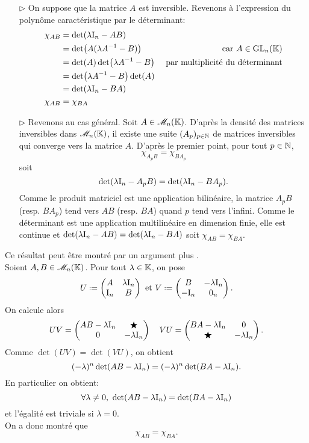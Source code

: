 \begin{solution}
    \begin{itemize}
    \item[$\rhd$] On suppose que la matrice $A$ est inversible. Revenons à l'expression du polynôme caractéristique par le déterminant:
        \begin{align*}
        \chi_{AB} &= \det(\lambda \mathrm{I}_n - AB) \\
        &= \det(A(\lambda A^{-1} - B)) &\text{car } A \in \mathrm{GL}_n(\mathbb{K}) \\
        &= \det(A) \det(\lambda A^{-1} - B) &\text{ par multiplicité du déterminant} \\
        &= \det(\lambda A^{-1} - B) \det(A) \\
        &= \det(\lambda \mathrm{I}_n - BA) \\
        \chi_{AB} &= \chi_{BA}
    \end{align*}
    \item[$\rhd$] Revenons au cas général. Soit $A \in \mathscr{M}_n(\mathbb{K})$. D'après la densité des matrices inversibles dans $\mathscr{M}_n(\mathbb{K})$, il existe une suite $(A_p)_{p \in \mathbb{N}}$ de matrices inversibles qui converge vers la matrice $A$. D'après le premier point, pour tout $p \in \mathbb{N}$,
    $$\chi_{A_p B} = \chi_{B A_p}$$
    soit 
    $$\det(\lambda \mathrm{I}_n - A_p B) = \det(\lambda \mathrm{I}_n - B A_p).$$
    Comme le produit matriciel est une application bilinéaire, la matrice $A_p B$ (resp. $B A_p$) tend vers $AB$ (resp. $BA$) quand $p$ tend vers l'infini. Comme le déterminant est une application multilinéaire en dimension finie, elle est continue et $\det(\lambda \mathrm{I}_n - A B) = \det(\lambda \mathrm{I}_n - B A)$ soit $\chi_{A B} = \chi_{B A}$. \\
    \end{itemize}
\end{solution}

Ce résultat peut être montré par un argument plus . \\
Soient $A, B \in \mathscr{M}_n(\mathbb{K})$. Pour tout $\lambda \in \mathbb{K}$, on pose
$$
U \defeq
\begin{pmatrix}
    A & \lambda \I_n \\
    \I_n & B
\end{pmatrix}
\text{ et }
V \defeq 
\begin{pmatrix}
    B & -\lambda \I_n \\
    -\I_n & 0_n
\end{pmatrix}.
$$
On calcule alors
$$UV = 
\begin{pmatrix}
    AB - \lambda \mathrm{I}_n & \bigstar \\
    0 & -\lambda \mathrm{I}_n
\end{pmatrix}
\quad
VU = 
\begin{pmatrix}
    BA - \lambda \mathrm{I}_n & 0 \\
    \bigstar & -\lambda \mathrm{I}_n
\end{pmatrix}.
$$
Comme $\det(UV) = \det(VU)$, on obtient
$$(-\lambda)^n \det(AB - \lambda \mathrm{I}_n) = (-\lambda)^n \det(BA - \lambda \mathrm{I}_n).$$
En particulier on obtient:
$$\forall \lambda \not= 0,\ \det(AB - \lambda \mathrm{I}_n) = \det(BA - \lambda \mathrm{I}_n)$$
et l'égalité est triviale si $\lambda = 0$. \\
On a donc montré que 
$$\chi_{A B} = \chi_{B A}.$$

